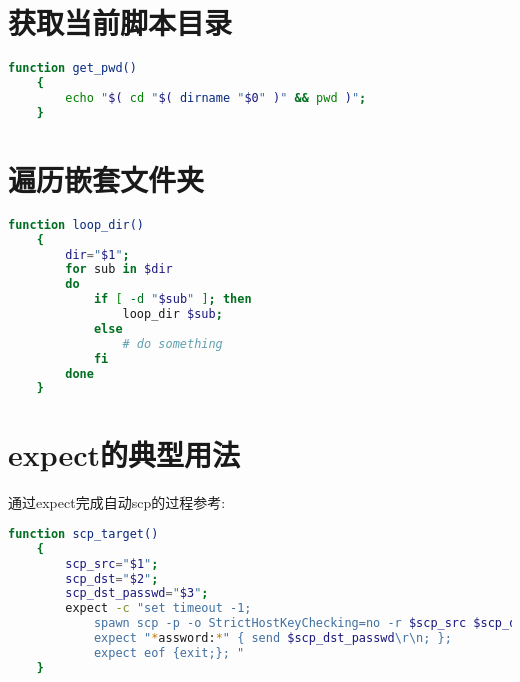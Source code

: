 \section {\ZHH 获取当前脚本目录} {
    \begin{lstlisting}[language=bash]
    function get_pwd()
    {
        echo "$( cd "$( dirname "$0" )" && pwd )";
    }
    \end{lstlisting}
}


\section {\ZHH 遍历嵌套文件夹} {
    \begin{lstlisting}[language=bash]
    function loop_dir()
    {
        dir="$1";
        for sub in $dir
        do
            if [ -d "$sub" ]; then
                loop_dir $sub;
            else
                # do something
            fi
        done
    }
    \end{lstlisting}
}


\section {\ZHH expect的典型用法} {
    {通过expect完成自动scp的过程参考: }\par
    \begin{lstlisting}[language=bash]
    function scp_target()
    {
        scp_src="$1";
        scp_dst="$2";
        scp_dst_passwd="$3";
        expect -c "set timeout -1;
            spawn scp -p -o StrictHostKeyChecking=no -r $scp_src $scp_dst;
            expect "*assword:*" { send $scp_dst_passwd\r\n; }; 
            expect eof {exit;}; "
    }
    \end{lstlisting}
}


